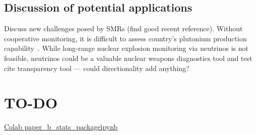 \subsection{Discussion of potential applications}
Discuss new challenges posed by SMRs (find good recent reference).
Without cooperative monitoring, it is difficult to assess country's plutonium production capability~\cite{Park:2024ykj}.
While long-range nuclear explosion monitoring via neutrinos is not feasible, neutrinos could be a valuable nuclear weapons diagnostics tool and test cite transparency tool --- could directionality add anything?




\section{TO-DO}

\href{https://colab.research.google.com/drive/1VZJIC3z2_7nOzAeaxa6edl2SoWqFfMP8?usp=sharing}{Colab paper\_b\_stats\_package\.ipynb}


